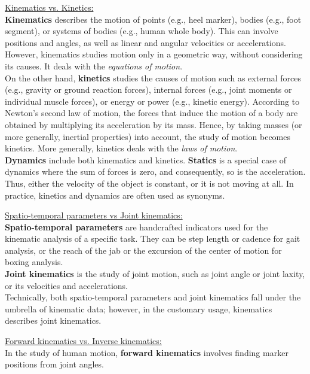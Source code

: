 \noindent\underline{Kinematics vs. Kinetics: }\\
\textbf{Kinematics} describes the motion of points (e.g., heel marker), bodies (e.g., foot segment), or systems of bodies (e.g., human whole body). This can involve positions and angles, as well as linear and angular velocities or accelerations. However, kinematics studies motion only in a geometric way, without considering its causes. It deals with the \emph{equations of motion}.\\
On the other hand, \textbf{kinetics} studies the causes of motion such as external forces (e.g., gravity or ground reaction forces), internal forces (e.g., joint moments or individual muscle forces), or energy or power (e.g., kinetic energy). According to Newton's second law of motion, the forces that induce the motion of a body are obtained by multiplying its acceleration by its mass. Hence, by taking masses (or more generally, inertial properties) into account, the study of motion becomes kinetics. More generally, kinetics deals with the \emph{laws of motion}.\\
\textbf{Dynamics} include both kinematics and kinetics. \textbf{Statics} is a special case of dynamics where the sum of forces is zero, and consequently, so is the acceleration. Thus, either the velocity of the object is constant, or it is not moving at all. In practice, kinetics and dynamics are often used as synonyms.

\vspace*{0.5cm}

\noindent\underline{Spatio-temporal parameters vs Joint kinematics:}\\
\textbf{Spatio-temporal parameters} are handcrafted indicators used for the kinematic analysis of a specific task. They can be step length or cadence for gait analysis, or the reach of the jab or the excursion of the center of motion for boxing analysis.\\
\textbf{Joint kinematics} is the study of joint motion, such as joint angle or joint laxity, or its velocities and accelerations.\\
Technically, both spatio-temporal parameters and joint kinematics fall under the umbrella of kinematic data; however, in the customary usage, kinematics describes joint kinematics.

\vspace*{0.5cm}

\noindent\underline{Forward kinematics vs. Inverse kinematics:}\\
In the study of human motion, \textbf{forward kinematics} involves finding marker positions from joint angles.

